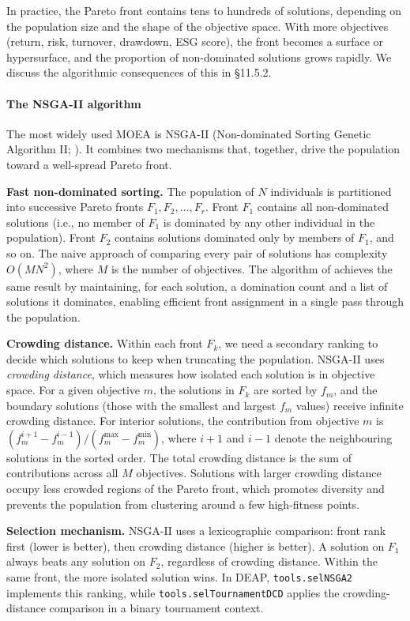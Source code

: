 In practice, the Pareto front contains tens to hundreds of solutions, depending on the population size and the shape of the objective space. With more objectives (return, risk, turnover, drawdown, ESG score), the front becomes a surface or hypersurface, and the proportion of non-dominated solutions grows rapidly. We discuss the algorithmic consequences of this in §11.5.2.

\paragraph{The NSGA-II algorithm}

The most widely used MOEA is NSGA-II (Non-dominated Sorting Genetic Algorithm II; \citep{Deb2002}). It combines two mechanisms that, together, drive the population toward a well-spread Pareto front.

\textbf{Fast non-dominated sorting.} The population of $N$ individuals is partitioned into successive Pareto fronts $F_1, F_2, \ldots, F_r$. Front $F_1$ contains all non-dominated solutions (i.e., no member of $F_1$ is dominated by any other individual in the population). Front $F_2$ contains solutions dominated only by members of $F_1$, and so on. The naive approach of comparing every pair of solutions has complexity $O(MN^2)$, where $M$ is the number of objectives. The algorithm of \cite{Deb2002} achieves the same result by maintaining, for each solution, a domination count and a list of solutions it dominates, enabling efficient front assignment in a single pass through the population.

\textbf{Crowding distance.} Within each front $F_k$, we need a secondary ranking to decide which solutions to keep when truncating the population. NSGA-II uses \textit{crowding distance}, which measures how isolated each solution is in objective space. For a given objective $m$, the solutions in $F_k$ are sorted by $f_m$, and the boundary solutions (those with the smallest and largest $f_m$ values) receive infinite crowding distance. For interior solutions, the contribution from objective $m$ is $(f_m^{i+1} - f_m^{i -1}) / (f_m^{\max} - f_m^{\min})$, where $i+1$ and $i -1$ denote the neighbouring solutions in the sorted order. The total crowding distance is the sum of contributions across all $M$ objectives. Solutions with larger crowding distance occupy less crowded regions of the Pareto front, which promotes diversity and prevents the population from clustering around a few high-fitness points.

\textbf{Selection mechanism.} NSGA-II uses a lexicographic comparison: front rank first (lower is better), then crowding distance (higher is better). A solution on $F_1$ always beats any solution on $F_2$, regardless of crowding distance. Within the same front, the more isolated solution wins. In DEAP, \texttt{tools.selNSGA2} implements this ranking, while \texttt{tools.selTournamentDCD} applies the crowding-distance comparison in a binary tournament context.

